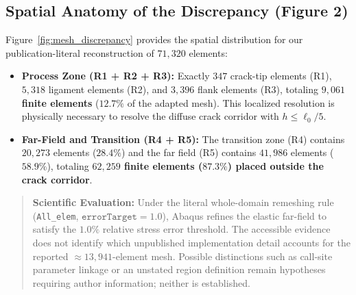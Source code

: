 \subsection{Spatial Anatomy of the Discrepancy (Figure 2)}
Figure~\ref{fig:mesh_discrepancy} provides the spatial distribution for our publication-literal reconstruction of $71{,}320$ elements:
\begin{itemize}[leftmargin=4mm,itemsep=1pt,topsep=1pt]
  \item \textbf{Process Zone (R1 + R2 + R3):} Exactly $347$ crack-tip elements (R1), $5{,}318$ ligament elements (R2), and $3{,}396$ flank elements (R3), totaling \textbf{$9{,}061$ finite elements} ($12.7\%$ of the adapted mesh). This localized resolution is physically necessary to resolve the diffuse crack corridor with $h \le \ell_0 / 5$.
  \item \textbf{Far-Field and Transition (R4 + R5):} The transition zone (R4) contains $20{,}273$ elements ($28.4\%$) and the far field (R5) contains $41{,}986$ elements ($58.9\%$), totaling \textbf{$62{,}259$ finite elements ($87.3\%$) placed outside the crack corridor}.
\end{itemize}

\begin{quote}
\textbf{Scientific Evaluation:} Under the literal whole-domain remeshing rule (\texttt{All\_elem}, $\texttt{errorTarget}=1.0$), Abaqus refines the elastic far-field to satisfy the $1.0\%$ relative stress error threshold. The accessible evidence does not identify which unpublished implementation detail accounts for the reported $\approx 13{,}941$-element mesh. Possible distinctions such as call-site parameter linkage or an unstated region definition remain hypotheses requiring author information; neither is established.
\end{quote}
